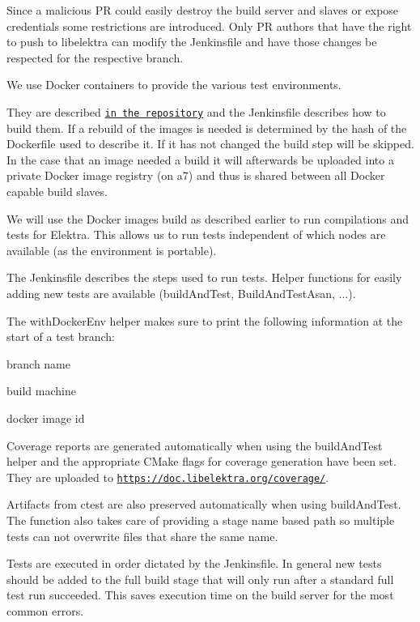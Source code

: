 Since a malicious PR could easily destroy the build server and slaves or expose credentials some restrictions are introduced. Only PR authors that have the right to push to libelektra can modify the Jenkinsfile and have those changes be respected for the respective branch.

We use Docker containers to provide the various test environments.

They are described \href{https://master.libelektra.org/scripts/docker}{\tt in the repository} and the Jenkinsfile describes how to build them. If a rebuild of the images is needed is determined by the hash of the Dockerfile used to describe it. If it has not changed the build step will be skipped. In the case that an image needed a build it will afterwards be uploaded into a private Docker image registry (on a7) and thus is shared between all Docker capable build slaves.

We will use the Docker images build as described earlier to run compilations and tests for Elektra. This allows us to run tests independent of which nodes are available (as the environment is portable).

The Jenkinsfile describes the steps used to run tests. Helper functions for easily adding new tests are available ({\ttfamily build\+And\+Test}, {\ttfamily Build\+And\+Test\+Asan}, ...).

The {\ttfamily with\+Docker\+Env} helper makes sure to print the following information at the start of a test branch\+:


\begin{DoxyItemize}
\item branch name
\item build machine
\item docker image id
\end{DoxyItemize}

Coverage reports are generated automatically when using the {\ttfamily build\+And\+Test} helper and the appropriate C\+Make flags for coverage generation have been set. They are uploaded to \href{https://doc.libelektra.org/coverage/}{\tt https\+://doc.\+libelektra.\+org/coverage/}.

Artifacts from {\ttfamily ctest} are also preserved automatically when using {\ttfamily build\+And\+Test}. The function also takes care of providing a stage name based path so multiple tests can not overwrite files that share the same name.

Tests are executed in order dictated by the Jenkinsfile. In general new tests should be added to the \textquotesingle{}full build stage\textquotesingle{} that will only run after a standard full test run succeeded. This saves execution time on the build server for the most common errors.

